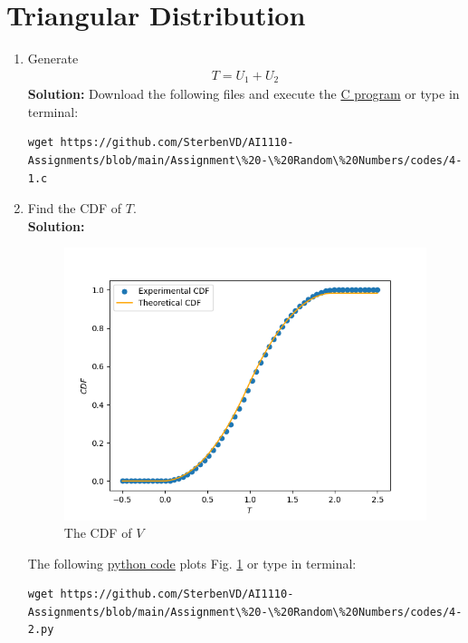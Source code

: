 \documentclass[journal,12pt,onecolumn]{IEEEtran}
\numberwithin{equation}{section}
\renewcommand\thesection{\arabic{section}}
\providecommand{\gitlink}[2]{{\color{blue}\href{https://github.com/SterbenVD/AI1110-Assignments/blob/main/Assignment\%20-\%20Random\%20Numbers/#1}{#2}}}
\newcommand{\solution}{\noindent \textbf{Solution: }}
\begin{document}
\section{Triangular Distribution}
\begin{enumerate}[label=\thesection.\arabic*
        ,ref=\thesection.\theenumi]
    \item Generate
          \begin{align}
              T = U_1+U_2
          \end{align}
          \solution Download the following files and execute the \gitlink{codes/4-1.c}{C program} or type in terminal:
          \begin{lstlisting}
wget https://github.com/SterbenVD/AI1110-Assignments/blob/main/Assignment\%20-\%20Random\%20Numbers/codes/4-1.c
            \end{lstlisting}
    \item Find the CDF of $T$.
          \\
          \solution
          \begin{figure}[H]
              \centering
              \includegraphics[scale = 0.5]{../figs/4_cdf}
              \caption{The CDF of $V$}
              \label{fig:4_cdf}
          \end{figure}
          The following \gitlink{codes/4-2.py}{python code} plots Fig. \ref{fig:4_cdf} or type in terminal:
          \begin{lstlisting}
wget https://github.com/SterbenVD/AI1110-Assignments/blob/main/Assignment\%20-\%20Random\%20Numbers/codes/4-2.py
            \end{lstlisting}

\end{enumerate}
\end{document}
